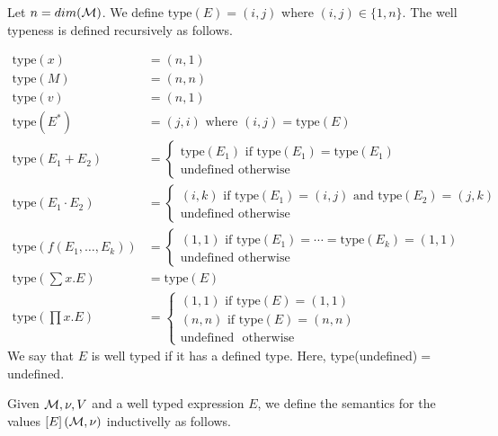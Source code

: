 Let $n=dim(\mathcal{M})$. We define $\text{type}(E)=(i,j)$ where $(i,j)\in \lbrace 1, n\rbrace$. The well typeness is defined recursively as follows.

\begin{align*}
\text{type}(x) &= (n,1) \\
\text{type}(M) &= (n,n) \\
\text{type}(v) &= (n,1) \\
\text{type}(E^*)&=(j,i) \text{ where } (i,j)=\text{type}(E) \\
\text{type}(E_1 + E_2) &= \begin{cases}
               \text{type}(E_1) \text{ if } \text{type}(E_1)=\text{type}(E_1) \\
               \text{undefined} \text{ otherwise }
            \end{cases} \\
\text{type}(E_1\cdot E_2)&=\begin{cases}
               (i,k) \text{ if } \text{type}(E_1)=(i,j)\text{ and type}(E_2)=(j,k) \\
               \text{undefined} \text{ otherwise }
            \end{cases} \\
\text{type}(f(E_1,\ldots, E_k))&=\begin{cases}
               (1,1) \text{ if } \text{type}(E_1)=\cdots =\text{type}(E_k)=(1,1) \\
               \text{undefined} \text{ otherwise }
            \end{cases} \\
\text{type}\left(\sum x.E\right) &= \text{type}(E) \\
\text{type}\left(\prod x. E\right) &=
\begin{cases}
               (1,1) \text{ if } \text{type}(E)=(1,1) \\
               (n,n) \text{ if } \text{type}(E)=(n,n) \\
               \text{undefined } \text{ otherwise }
            \end{cases}
\end{align*}
We say that $E$ is well typed if it has a defined type. Here, type(undefined)$=$ undefined.


Given $\mathcal{M}, \nu, V$ and a well typed expression $E$, we define the semantics for the values $\left[ E\right](\mathcal{M},\nu)$ inductivelly as follows. 


